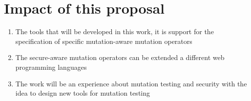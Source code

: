 \section{Impact of this proposal}

\begin{enumerate}
    \item The tools that will be developed in this work, it is support for the specification of specific mutation-aware mutation operators
    \item The secure-aware mutation operators can be extended a different web programming languages
    \item The work will be an experience about mutation testing and security with the idea to design new tools for mutation testing
\end{enumerate}
